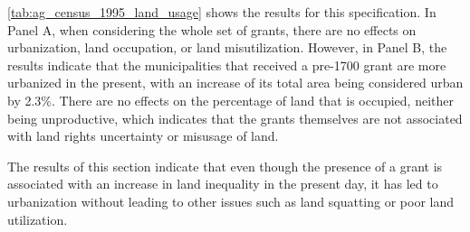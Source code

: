 \documentclass[11pt]{article}
\begin{document}
\autoref{tab:ag_census_1995_land_usage} shows the results for this specification. 
In Panel A, when considering the whole set of grants, there are no effects on urbanization, land occupation, or land misutilization.
However, in Panel B, the results indicate that the municipalities that received a pre-1700 grant are more urbanized in the present, with an increase of its total area being considered urban by 2.3\%. 
There are no effects on the percentage of land that is occupied, neither being unproductive, which indicates that the grants themselves are not associated with land rights uncertainty or misusage of land.

The results of this section indicate that even though the presence of a grant is associated with an increase in land inequality in the present day, it has led to urbanization without leading to other issues such as land squatting or poor land utilization.







\end{document}
